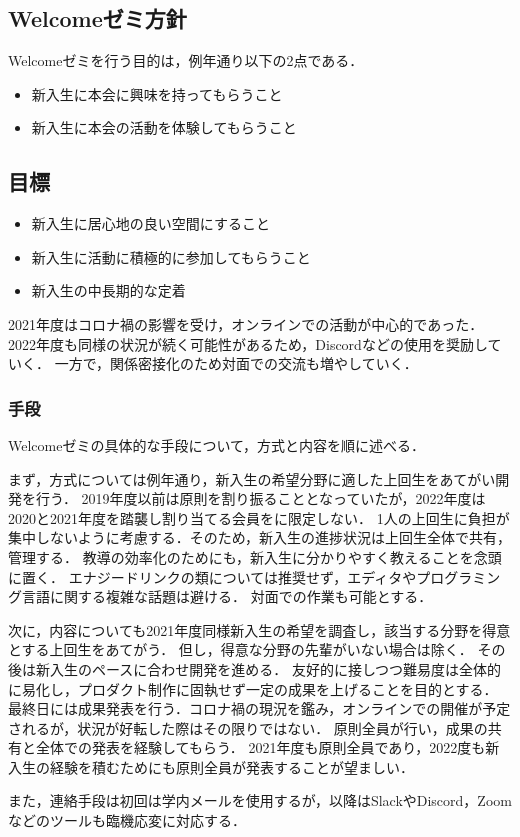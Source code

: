 \subsection*{Welcomeゼミ方針}



Welcomeゼミを行う目的は，例年通り以下の2点である．

\begin{itemize}
    \item 新入生に本会に興味を持ってもらうこと
    \item 新入生に本会の活動を体験してもらうこと
\end{itemize}

\subsection*{目標}
\begin{itemize}
    \item 新入生に居心地の良い空間にすること
    \item 新入生に活動に積極的に参加してもらうこと
    \item 新入生の中長期的な定着
\end{itemize}

2021年度はコロナ禍の影響を受け，オンラインでの活動が中心的であった．
2022年度も同様の状況が続く可能性があるため，Discordなどの使用を奨励していく．
一方で，関係密接化のため対面での交流も増やしていく．

\subsubsection*{手段}
Welcomeゼミの具体的な手段について，方式と内容を順に述べる．

まず，方式については例年通り，新入生の希望分野に適した上回生をあてがい開発を行う．
2019年度以前は原則\secondGrade{}を割り振ることとなっていたが，2022年度は2020と2021年度を踏襲し割り当てる会員を\secondGrade{}に限定しない．
1人の上回生に負担が集中しないように考慮する．そのため，新入生の進捗状況は上回生全体で共有，管理する．
教導の効率化のためにも，新入生に分かりやすく教えることを念頭に置く．
エナジードリンクの類については推奨せず，エディタやプログラミング言語に関する複雑な話題は避ける．
対面での作業も可能とする．

次に，内容についても2021年度同様新入生の希望を調査し，該当する分野を得意とする上回生をあてがう．
但し，得意な分野の先輩がいない場合は除く．
その後は新入生のペースに合わせ開発を進める．
友好的に接しつつ難易度は全体的に易化し，プロダクト制作に固執せず一定の成果を上げることを目的とする．
最終日には成果発表を行う．コロナ禍の現況を鑑み，オンラインでの開催が予定されるが，状況が好転した際はその限りではない．
原則全員が行い，成果の共有と全体での発表を経験してもらう．
2021年度も原則全員であり，2022度も新入生の経験を積むためにも原則全員が発表することが望ましい．

また，連絡手段は初回は学内メールを使用するが，以降はSlackやDiscord，Zoomなどのツールも臨機応変に対応する．
